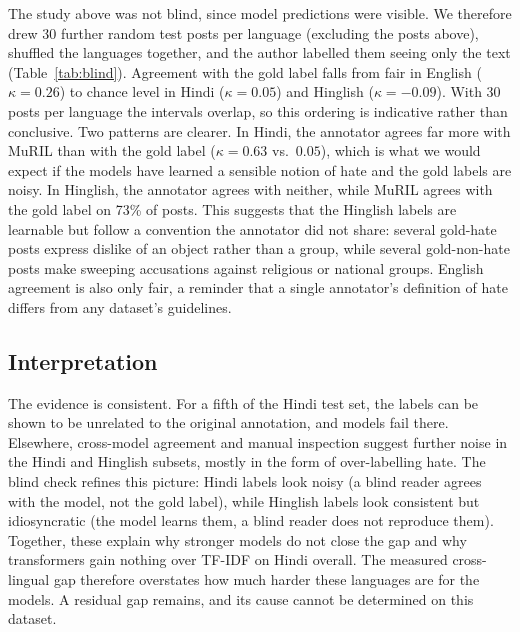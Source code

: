 \documentclass[11pt,a4paper]{article}
\begin{document}
The study above was not blind, since model predictions were visible.
We therefore drew 30 further random test posts per language (excluding the posts above), shuffled the languages together, and the author labelled them seeing only the text (Table~\ref{tab:blind}).
Agreement with the gold label falls from fair in English ($\kappa = 0.26$) to chance level in Hindi ($\kappa = 0.05$) and Hinglish ($\kappa = -0.09$).
With 30 posts per language the intervals overlap, so this ordering is indicative rather than conclusive.
Two patterns are clearer.
In Hindi, the annotator agrees far more with MuRIL than with the gold label ($\kappa = 0.63$ vs.\ $0.05$), which is what we would expect if the models have learned a sensible notion of hate and the gold labels are noisy.
In Hinglish, the annotator agrees with neither, while MuRIL agrees with the gold label on 73\% of posts.
This suggests that the Hinglish labels are learnable but follow a convention the annotator did not share: several gold-hate posts express dislike of an object rather than a group, while several gold-non-hate posts make sweeping accusations against religious or national groups.
English agreement is also only fair, a reminder that a single annotator's definition of hate differs from any dataset's guidelines.

\subsection{Interpretation}
The evidence is consistent.
For a fifth of the Hindi test set, the labels can be shown to be unrelated to the original annotation, and models fail there.
Elsewhere, cross-model agreement and manual inspection suggest further noise in the Hindi and Hinglish subsets, mostly in the form of over-labelling hate.
The blind check refines this picture: Hindi labels look noisy (a blind reader agrees with the model, not the gold label), while Hinglish labels look consistent but idiosyncratic (the model learns them, a blind reader does not reproduce them).
Together, these explain why stronger models do not close the gap and why transformers gain nothing over TF-IDF on Hindi overall.
The measured cross-lingual gap therefore overstates how much harder these languages are for the models. A residual gap remains, and its cause cannot be determined on this dataset.
\end{document}

